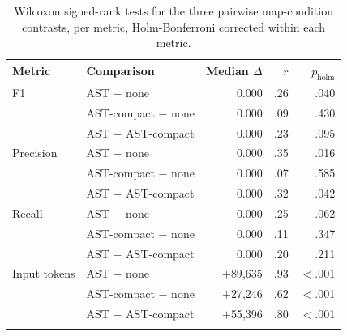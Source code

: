 
\begin{table}[htbp]
\centering
\caption{Wilcoxon signed-rank tests for the three pairwise map-condition contrasts, per metric, Holm-Bonferroni corrected within each metric.}
\label{tab:map-comparison-wilcoxon}
\begin{tabular}{@{}l l r r r@{}}
\toprule
Metric & Comparison & Median $\Delta$ & $r$ & $p_{\text{holm}}$ \\
\midrule
F1        & AST $-$ none          & 0.000 & .26  & .040 \\
          & AST-compact $-$ none  & 0.000 & .09  & .430 \\
          & AST $-$ AST-compact   & 0.000 & .23  & .095 \\
\addlinespace
Precision & AST $-$ none          & 0.000 & .35  & .016 \\
          & AST-compact $-$ none  & 0.000 & .07  & .585 \\
          & AST $-$ AST-compact   & 0.000 & .32  & .042 \\
\addlinespace
Recall    & AST $-$ none          & 0.000 & .25  & .062 \\
          & AST-compact $-$ none  & 0.000 & .11  & .347 \\
          & AST $-$ AST-compact   & 0.000 & .20  & .211 \\
\addlinespace
Input tokens         & AST $-$ none          & $+$89{,}635 & .93 & $<$.001 \\
                     & AST-compact $-$ none  & $+$27{,}246 & .62 & $<$.001 \\
                     & AST $-$ AST-compact   & $+$55{,}396 & .80 & $<$.001 \\
\addlinespace

\end{tabular}
\end{table}

